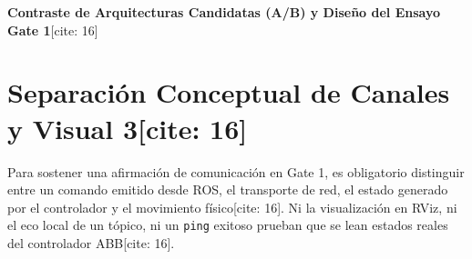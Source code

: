 \documentclass[11pt, a4paper]{article}
\begin{document}
\begin{center}
    \Large\textbf{\textcolor{ucbblue}{Contraste de Arquitecturas Candidatas (A/B) y Diseño del Ensayo Gate 1}}[cite: 16]
\end{center}

\section{Separación Conceptual de Canales y Visual 3[cite: 16]}
Para sostener una afirmación de comunicación en Gate 1, es obligatorio distinguir entre un comando emitido desde ROS, el transporte de red, el estado generado por el controlador y el movimiento físico[cite: 16]. Ni la visualización en RViz, ni el eco local de un tópico, ni un \texttt{ping} exitoso prueban que se lean estados reales del controlador ABB[cite: 16].
\end{document}
